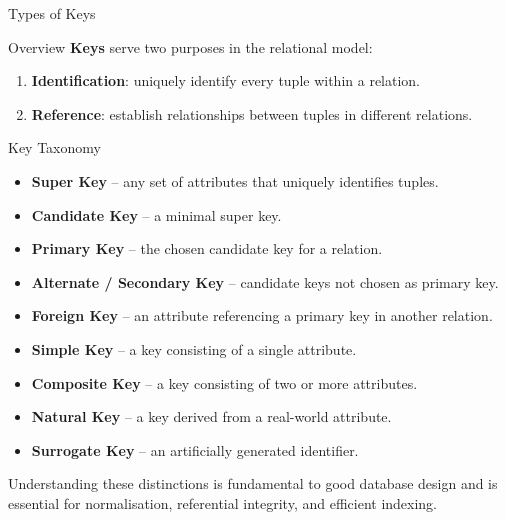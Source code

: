 \begin{frame}{Types of Keys}
  \begin{block}{Overview}
    \textbf{Keys} serve two purposes in the relational model:
    \begin{enumerate}
      \item \textbf{Identification}: uniquely identify every tuple within
            a relation.
      \item \textbf{Reference}: establish relationships between tuples in
            different relations.
    \end{enumerate}
  \end{block}

  \begin{block}{Key Taxonomy}
    \begin{itemize}
      \item \textbf{Super Key} -- any set of attributes that uniquely
            identifies tuples.
      \item \textbf{Candidate Key} -- a minimal super key.
      \item \textbf{Primary Key} -- the chosen candidate key for a relation.
      \item \textbf{Alternate / Secondary Key} -- candidate keys not
            chosen as primary key.
      \item \textbf{Foreign Key} -- an attribute referencing a primary key
            in another relation.
      \item \textbf{Simple Key} -- a key consisting of a single attribute.
      \item \textbf{Composite Key} -- a key consisting of two or more
            attributes.
      \item \textbf{Natural Key} -- a key derived from a real-world attribute.
      \item \textbf{Surrogate Key} -- an artificially generated identifier.
    \end{itemize}
  \end{block}

  Understanding these distinctions is fundamental to good database design and
  is essential for normalisation, referential integrity, and efficient indexing.
\end{frame}

